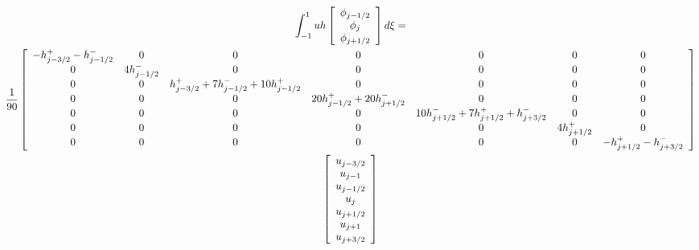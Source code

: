 \documentclass[12pt]{article}
\begin{document}
\newpage

\begin{landscape}
	\begin{multline*}
	\int_{-1}^{1} uh \left[\begin{array}{c}\phi_{j-1/2} \\\phi_{j}\\\phi_{j+1/2} \end{array}\right] d \xi = \\
	\frac{1}{90} \left[\begin{array}{c c c c c c c}
	- h^+ _{j - 3/2} - h^- _{j - 1/2}  & 0 & 0 &0 &0 & 0 & 0  \\
	0 &4h^- _{j - 1/2} & 0 & 0 &0 & 0 &0  \\
	0 & 0 &h^+ _{j - 3/2} + 7h^- _{j - 1/2} + 10 h^+ _{j - 1/2}  & 0 & 0 & 0 &0  \\ 
	0 & 0 & 0 & 20h^+ _{j - 1/2} +  20 h^- _{j + 1/2}& 0 & 0 &0  \\ 
	0 & 0 & 0 & 0 & 10h^- _{j + 1/2} + 7h^+ _{j + 1/2} +h^- _{j + 3/2} & 0 &0  \\
	0 & 0 & 0 & 0 &0 & 4 h^+ _{j + 1/2}  &0\\
	0 & 0 & 0 & 0 &0 & 0 &-h^+ _{j + 1/2} - h^- _{j + 3/2} \end{array}\right]\\ 
	\left[\begin{array}{c}u_{j-3/2} \\ u_{j-1} \\u_{j-1/2} \\u_{j}\\u_{j+1/2} \\ u_{j+1} \\ u_{j+3/2} \end{array}\right]
	\end{multline*}
	
\end{landscape}

\newpage
\end{document}
